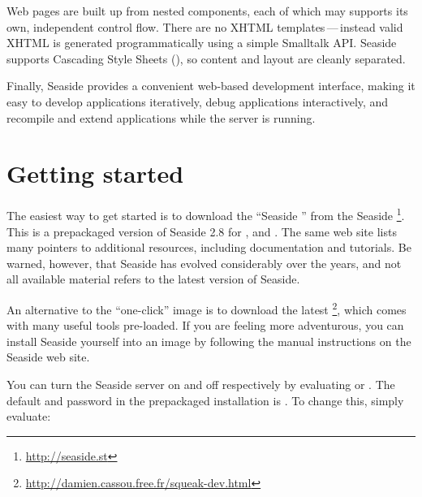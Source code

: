 \documentclass[a4paper,10pt,twoside]{book}
\begin{document}
Web pages are built up from nested components, each of which may supports its own, independent control flow.
There are no XHTML templates\,---\,instead valid XHTML is generated programmatically using a simple Smalltalk API.
Seaside supports Cascading Style Sheets (), so content and layout are cleanly separated.

Finally, Seaside provides a convenient web-based development interface, making it easy to develop applications iteratively, debug applications interactively, and recompile and extend applications while the server is running.

\section{Getting started}

The easiest way to get started is to download the ``Seaside '' from the Seaside \footnote{\url{http://seaside.st}}.
This is a prepackaged version of Seaside 2.8 for ,  and .
The same web site lists many pointers to additional resources, including documentation and tutorials.
Be warned, however, that Seaside has evolved considerably over the years, and not all available material refers to the latest version of Seaside.

An alternative to the ``one-click'' image is to download the latest \footnote{\url{http://damien.cassou.free.fr/squeak-dev.html}}, which comes with many useful tools pre-loaded.
If you are feeling more adventurous, you can install Seaside yourself into an image by following the manual  instructions on the Seaside web site.

You can turn the Seaside server on and off respectively by evaluating
 
or
.
The default  and password in the prepackaged installation is .
To change this, simply evaluate:  
\end{document}
